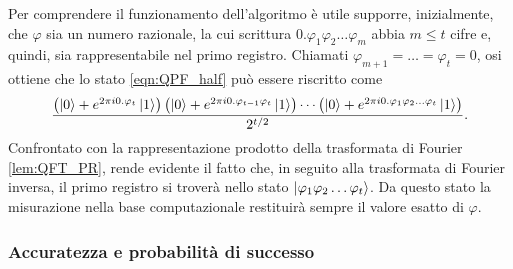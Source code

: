 Per comprendere il funzionamento dell'algoritmo è utile supporre, inizialmente, che $\varphi$ sia un numero razionale, la cui scrittura $0.\varphi_1\varphi_2\dots\varphi_m$ abbia $m \leq t$ cifre e, quindi, sia rappresentabile nel primo registro. 
Chiamati $\varphi_{m+1} = \dots = \varphi_t = 0$, osi ottiene che lo stato \eqref{eqn:QPF_half} può essere riscritto come
\begin{equation}
 \frac{\left(\ket{0} + e^{2 \pi i 0.\varphi_t} \ket{1} \right) \left(\ket{0} + e^{2 \pi i 0.\varphi_{t-1}\varphi_t} \ket{1} \right) \cdots \left(\ket{0} + e^{2 \pi i 0.\varphi_1\varphi_2 \dots \varphi_t} \ket{1} \right)}{2^{t/2}}.
\end{equation}
Confrontato con la rappresentazione prodotto della trasformata di Fourier \eqref{lem:QFT_PR}, rende evidente il fatto che, in seguito alla trasformata di Fourier inversa, il primo registro si troverà nello stato $\ket{\varphi_1\varphi_2\dots\varphi_t}$. 
Da questo stato la misurazione nella base computazionale restituirà sempre il valore esatto di $\varphi$.

\subsubsection{Accuratezza e probabilità di successo}

